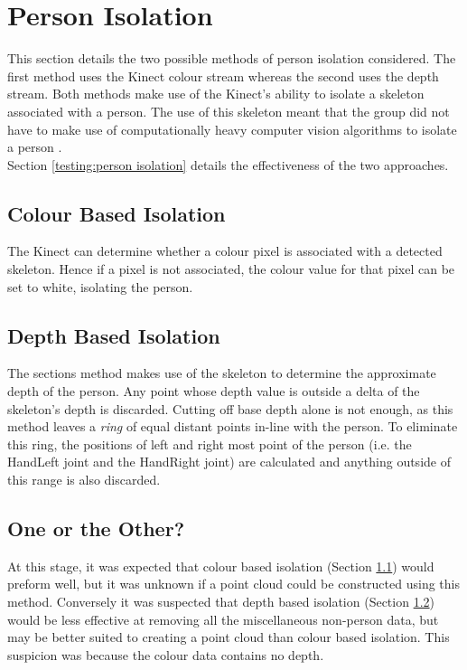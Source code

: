 \section{Person Isolation}
\label{design:person isolation}
This section details the two possible methods of person isolation considered.
The first method uses the Kinect colour stream whereas the second uses the depth stream.
Both methods make use of the Kinect's ability to isolate a skeleton associated with a person.
The use of this skeleton meant that the group did not have to make use of computationally heavy computer vision algorithms to isolate a person .\\

Section \ref{testing:person isolation} details the effectiveness of the two approaches.

\subsection{Colour Based Isolation}
\label{design:colour based isolation}
The Kinect can determine whether a colour pixel is associated with a detected skeleton. 
Hence if a pixel is not associated, the colour value for that pixel can be set to white, isolating the person.\\

\subsection{Depth Based Isolation}
\label{design:depth based isolation}
The sections method makes use of the skeleton to determine the approximate depth of the person. 
Any point whose depth value is outside a delta of the skeleton's depth is discarded.
Cutting off base depth alone is not enough, as this method leaves a \textit{ring} of equal distant points in-line with the person. 
To eliminate this ring, the positions of left and right most point of the person (i.e. the HandLeft joint and the HandRight joint) are calculated and anything outside of this range is also discarded. \\

\subsection{One or the Other?}
\label{design:one or the other?}
At this stage, it was expected that colour based isolation (Section \ref{design:colour based isolation}) would preform well, but it was unknown if a point cloud could be constructed using this method. 
Conversely it was suspected that depth based isolation (Section \ref{design:depth based isolation}) would be less effective at removing all the miscellaneous non-person data, but may be better suited to creating a point cloud than colour based isolation. This suspicion was because the colour data contains no depth.\\ 